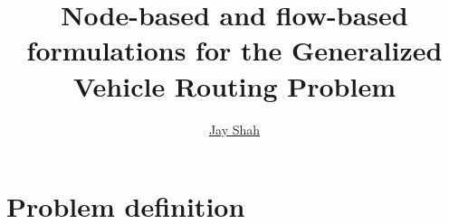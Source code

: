 \documentclass[11pt]{beamer}
\author{\href{mailto:jrshah@andrew.cmu.edu}{Jay Shah}}
\title{Node-based and flow-based formulations for the Generalized Vehicle Routing Problem}
\institute{\large{Carnegie Mellon University \\ 06-815 Project}}
\begin{document}
\begin{frame}
\titlepage
\end{frame}

\begin{frame}
\tableofcontents
\end{frame}

\section{Problem definition}
%
\end{document}
